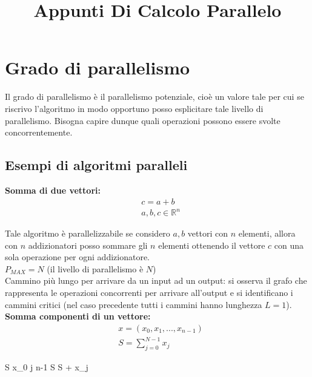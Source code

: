 \documentclass[a4paper,portrait,12pt]{article}
\theoremstyle{definition}
\begin{document}
\title{Appunti Di Calcolo Parallelo}

\maketitle
\date
\newpage

\tableofcontents
\newpage


\section{Grado di parallelismo}

Il grado di parallelismo è il parallelismo potenziale, cioè un valore tale per cui se riscrivo l'algoritmo in modo opportuno posso esplicitare tale livello di parallelismo. Bisogna capire dunque quali operazioni possono essere svolte concorrentemente.

\subsection{Esempi di algoritmi paralleli}

\textbf{Somma di due vettori:}
\begin{align}
&c = a + b\\
&a, b, c \in \mathbb{R}^n
\end{align}



Tale algoritmo è parallelizzabile se considero $a,b$ vettori con $n$ elementi, allora con $n$ addizionatori posso sommare gli $n$ elementi ottenendo il vettore $c$ con una sola operazione per ogni addizionatore.\\
$P_{MAX} = N$ (il livello di parallelismo è $N$)\\

Cammino più lungo per arrivare da un input ad un output: si osserva il grafo che rappresenta le operazioni concorrenti per arrivare all’output e si identificano i cammini critici (nel caso precedente tutti i cammini hanno lunghezza $L = 1$).\\

\textbf{Somma componenti di un vettore:}
\begin{align*}
&x = (x_0,x_1,...,x_{n-1})\\
&S = \sum_{j=0}^{N-1}x_j
\end{align*}



\begin{program}
S \gets x_0
\FOR j  \TO n-1 \DO
	S \gets S + x_j
\END
\end{program}
\end{document}
